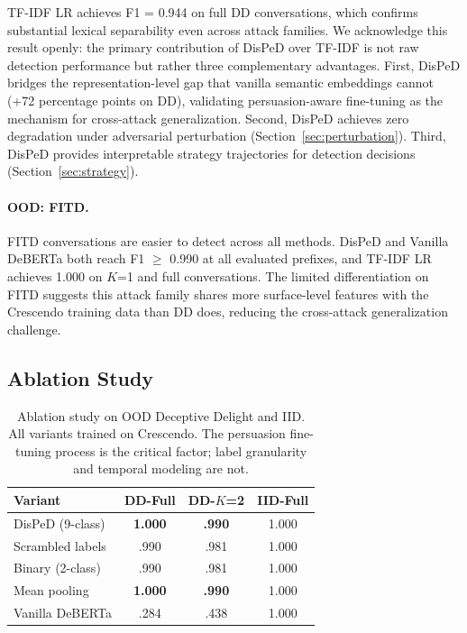TF-IDF LR achieves F1 = 0.944 on full DD conversations, which confirms substantial lexical separability even across attack families.
We acknowledge this result openly: the primary contribution of DisPeD over TF-IDF is not raw detection performance but rather three complementary advantages.
First, DisPeD bridges the representation-level gap that vanilla semantic embeddings cannot (+72 percentage points on DD), validating persuasion-aware fine-tuning as the mechanism for cross-attack generalization.
Second, DisPeD achieves zero degradation under adversarial perturbation (Section~\ref{sec:perturbation}).
Third, DisPeD provides interpretable strategy trajectories for detection decisions (Section~\ref{sec:strategy}).

\paragraph{OOD: FITD.}
FITD conversations are easier to detect across all methods.
DisPeD and Vanilla DeBERTa both reach F1 $\geq$ 0.990 at all evaluated prefixes, and TF-IDF LR achieves 1.000 on $K$=1 and full conversations.
The limited differentiation on FITD suggests this attack family shares more surface-level features with the Crescendo training data than DD does, reducing the cross-attack generalization challenge.

\subsection{Ablation Study}
\label{sec:ablation}

\begin{table}[t]
\centering
\small
\caption{Ablation study on OOD Deceptive Delight and IID. All variants trained on Crescendo. The persuasion fine-tuning process is the critical factor; label granularity and temporal modeling are not.}
\label{tab:ablation}
\begin{tabular}{@{}lccc@{}}
\toprule
\textbf{Variant} & DD-Full & DD-$K$=2 & IID-Full \\
\midrule
DisPeD (9-class) & \textbf{1.000} & \textbf{.990} & 1.000 \\
Scrambled labels & .990 & .981 & 1.000 \\
Binary (2-class) & .990 & .981 & 1.000 \\
Mean pooling & \textbf{1.000} & \textbf{.990} & 1.000 \\
\midrule
Vanilla DeBERTa & .284 & .438 & 1.000 \\
\bottomrule
\end{tabular}
\end{table}

